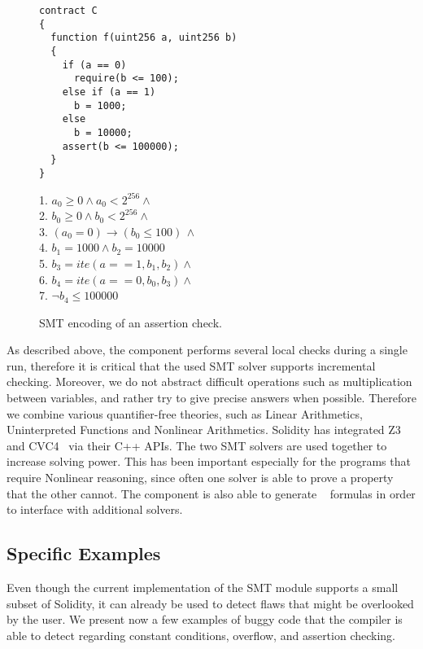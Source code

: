 \begin{figure}
\label{figure:solidity_encoding_1}
\noindent\begin{minipage}{.48\textwidth}
\begin{verbatim}
contract C
{
  function f(uint256 a, uint256 b)
  {
    if (a == 0)
      require(b <= 100);
    else if (a == 1)
      b = 1000;
    else
      b = 10000;
    assert(b <= 100000);
  }
}
\end{verbatim}
\end{minipage}\hfill
\begin{minipage}{.48\textwidth}
1. $a_0 \ge 0 \land a_0 < 2^{256}  \land \phantom{x}$\\
2. $b_0 \ge 0 \land b_0 < 2^{256}  \land \phantom{x}$\\
3. $(a_0 = 0) \rightarrow (b_0 \le 100) \, \land$\\
4. $b_1 = 1000 \land b_2 = 10000$\\
5. $b_3 = ite(a == 1, b_1, b_2) \land \phantom{x}$\\
6. $b_4 = ite(a == 0, b_0, b_3) \land \phantom{x}$\\
7. $\neg b_4 \le 100000$
\end{minipage}
\caption{SMT encoding of an assertion check.}
\end{figure}

As described above, the component performs several local checks during a single
run, therefore it is critical that the used SMT solver supports
incremental checking.
%
Moreover, we do not abstract difficult operations such as multiplication
between variables, and rather try to give precise answers when possible.
%
Therefore we combine various quantifier-free theories, such as Linear
Arithmetics, Uninterpreted Functions and Nonlinear Arithmetics. 
%
Solidity has integrated Z3~\cite{Z3} and CVC4~\cite{CVC4} via their C++ APIs.
%
The two SMT solvers are used together to increase solving power.
%
This has been important especially for the programs that require Nonlinear
reasoning, since often one solver is able to prove a property that the other
cannot.
%
The component is also able to generate ~\cite{SMTLIB}
formulas in order to interface with additional solvers.

\subsection{Specific Examples}

Even though the current implementation of the SMT module supports a small
subset of Solidity, it can already be used to detect flaws that might be
overlooked by the user.
%
We present now a few examples of buggy code that the compiler is able to
detect regarding constant conditions, overflow, and assertion checking.

